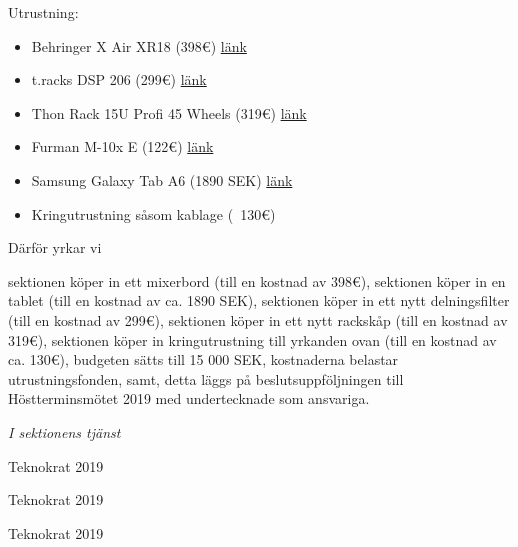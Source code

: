 \documentclass[../_main/handlingar.tex]{subfiles}
\begin{document}
    Utrustning: 
    \begin{itemize}
        \item Behringer X Air XR18 (398\euro)           \href{https://www.thomann.de/se/behringer_x_air_xr18.htm}{länk}
        \item t.racks DSP 206 (299\euro)                \href{https://www.thomann.de/se/the_t.racks_dsp_206.htm}{länk}
        \item Thon Rack 15U Profi 45 Wheels (319\euro) \href{https://www.thomann.de/se/thon_rack_15he_pro_live45_m_rollen.htm}{länk}
        \item Furman M-10x E (122\euro)                 \href{https://www.thomann.de/se/furman_m10x_e.htm}{länk}
        \item Samsung Galaxy Tab A6 (1890 SEK)          \href{https://www.netonnet.se/art/dator/surfplattor/samsung-galaxy-tab-a-10-1-2016-wifi-32gb-white/1002419.8899}{länk}
        \item Kringutrustning såsom kablage (~130\euro)
    \end{itemize}




    Därför yrkar vi 
    \begin{attsatser}
       \att sektionen köper in ett mixerbord (till en kostnad av 398\euro),
        \att sektionen köper in en tablet (till en kostnad av ca. 1890 SEK),
       \att sektionen köper in ett nytt delningsfilter (till en kostnad av 299\euro),
       \att sektionen köper in ett nytt rackskåp (till en kostnad av 319\euro),
       \att sektionen köper in kringutrustning till yrkanden ovan (till en kostnad av ca. 130\euro),
       \att budgeten sätts till 15 000 SEK,
       \att kostnaderna belastar utrustningsfonden, samt, 
       \att detta läggs på beslutsuppföljningen till Höstterminsmötet 2019 med undertecknade som ansvariga.

      \end{attsatser}

\begin{signatures}{3}
        \textit{I  sektionens tjänst}
        \signature{David Karlsson}{Teknokrat 2019}
        \signature{Emil P. Lundh}{Teknokrat 2019}
        \signature{Moa Rönnlund}{Teknokrat 2019}
    \end{signatures}
\end{document}
